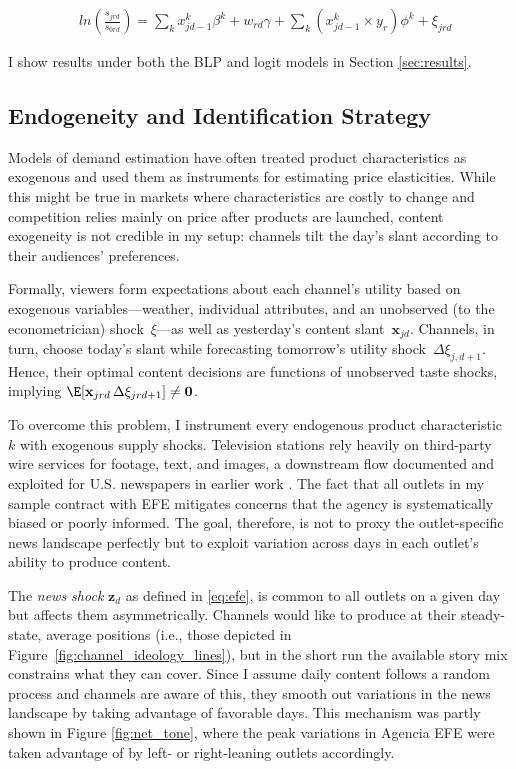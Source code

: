 \documentclass[12pt]{article}
\begin{document}
\begin{equation}\label{eq:logit}
	\begin{aligned}
		& ln \left(\frac{s_{jrd}}{s_{0rd}}\right)= \sum_k x_{jd-1}^k\beta^k+w_{rd}   \gamma  +\sum_k \left(x_{jd-1}^k\times y_r \right) \phi^k +  \xi_{jrd}
	\end{aligned} 
\end{equation} 


I show results under both the BLP and  logit models in  Section \ref{sec:results}. 
	
	\subsection{Endogeneity and Identification Strategy} \label{sec:endogeneity}
	\label{sec:identification}
	Models of demand estimation have often treated product characteristics as exogenous and used them as instruments for estimating price elasticities. While this might be true in markets where characteristics are costly to change and competition relies mainly on price after products are launched, content exogeneity is not credible in my setup: channels tilt the day's slant according to their audiences' preferences.
	
	Formally, viewers form expectations about each channel’s utility based on exogenous variables—weather, individual attributes, and an unobserved (to the econometrician) shock~$\xi$—as well as yesterday’s content slant~$\bm{x}_{jd}$. Channels, in turn, choose today’s slant while forecasting tomorrow’s utility shock~$\Delta\xi_{j,d+1}$. Hence, their optimal content decisions are functions of unobserved taste shocks, implying $\E[\mathbf{x}_{jrd}\,\Delta\xi_{jrd+1}] \neq \mathbf{0}$.
	
	To overcome this problem, I instrument every endogenous product characteristic~$k$ with exogenous supply shocks. Television stations rely heavily on third-party wire services for footage, text, and images, a downstream flow documented and exploited for U.S. newspapers in earlier work \citep{milena}. The fact that all outlets in my sample contract with EFE mitigates concerns that the agency is systematically biased or poorly informed. The goal, therefore, is not to proxy the outlet-specific news landscape perfectly but to exploit variation across days in each outlet’s ability to produce content.
	
	
	
	
The \emph{news shock} \(\bm{z}_d\) as defined in \ref{eq:efe},     is common to all outlets on a given day but affects them asymmetrically. Channels would like to produce at their steady-state, average positions (i.e., those depicted in Figure~\ref{fig:channel_ideology_lines}), but in the short run the available story mix constrains what they can cover. Since I assume daily content follows a random process and channels are aware of this, they smooth out variations in the news landscape by taking advantage of favorable days. This mechanism was partly shown in Figure \ref{fig:net_tone}, where the peak variations in Agencia EFE were taken advantage of by left- or right-leaning outlets accordingly.
\end{document}
